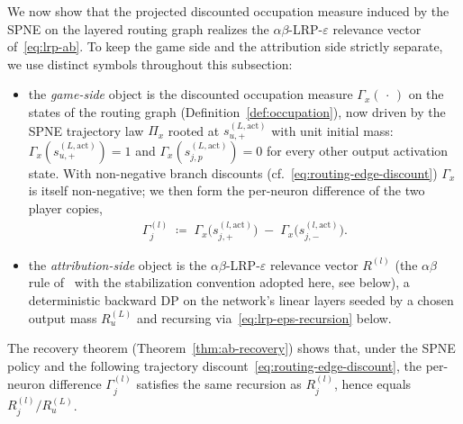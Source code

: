 \documentclass[twoside]{article}
\newif\ifch \chfalse
\newcommand{\ch}[1]{\ifch\textcolor{magenta}{#1}\else#1\fi}
\newcommand{\1}{\mathbf{1}}
\begin{document}
We now show that the projected discounted occupation measure induced by the SPNE on the layered
routing graph realizes the $\alpha\beta$-\ac{LRP}-$\varepsilon$ relevance vector
\ch{of~\eqref{eq:lrp-ab}}. To keep
the game side and the attribution side strictly separate, we use distinct symbols throughout this
subsection:
\begin{itemize}
    \item the \emph{game-side} object is the discounted occupation measure $\Gamma_x(\,\cdot\,)$ on the
        states of the routing graph (Definition~\ref{def:occupation}), now driven by the SPNE trajectory
        law $\Pi_x$ rooted at $s_{u,+}^{(L,\mathrm{act})}$ with unit initial mass:
        $\Gamma_x(s_{u,+}^{(L,\mathrm{act})}) = 1$ and $\Gamma_x(s_{j,p}^{(L,\mathrm{act})}) = 0$ for every
        other output activation state. With non-negative branch discounts
        (cf.~\eqref{eq:routing-edge-discount}) $\Gamma_x$ is itself non-negative; we then form the
        per-neuron difference of the two player copies,
        \begin{align}\label{eq:routing-Gamma-pair}
            \Gamma^{(l)}_j \;\coloneqq\;
            \Gamma_x\!\bigl(s_{j,+}^{(l,\mathrm{act})}\bigr)
            \;-\;
            \Gamma_x\!\bigl(s_{j,-}^{(l,\mathrm{act})}\bigr).
        \end{align}
    \item the \emph{attribution-side} object is the $\alpha\beta$-\ac{LRP}-$\varepsilon$ relevance
        vector $R^{(l)}$ \ch{(the $\alpha\beta$ rule of~\citet{Bach2015} with the stabilization convention
        adopted here, see below)}, a deterministic backward DP on the network's linear layers
        seeded by a chosen output mass $R_u^{(L)}$ and recursing via~\eqref{eq:lrp-eps-recursion} below.
\end{itemize}
The recovery theorem (Theorem~\ref{thm:ab-recovery}) shows that, under the SPNE policy and the
following trajectory discount~\eqref{eq:routing-edge-discount}, the per-neuron difference
$\Gamma^{(l)}_j$ satisfies the same recursion as $R^{(l)}_j$, hence equals $R^{(l)}_j/R^{(L)}_u$.
\end{document}
